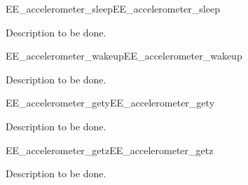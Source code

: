 \begin{function_nopb2}{EE\_accelerometer\_sleep}{EE_accelerometer_sleep}
  
  \begin{fundescription}
    Description to be done. 
  \end{fundescription}
  
  \begin{funreturn}
  \end{funreturn}
\end{function_nopb2}

\begin{function_nopb2}{EE\_accelerometer\_wakeup}{EE_accelerometer_wakeup}
  
  \begin{fundescription}
    Description to be done. 
  \end{fundescription}
  
  \begin{funreturn}
  \end{funreturn}
\end{function_nopb2}


\begin{function_nopb2}{EE\_accelerometer\_gety}{EE_accelerometer_gety}
  
  \begin{fundescription}
    Description to be done. 
  \end{fundescription}
  
  \begin{funreturn}
  \end{funreturn}
\end{function_nopb2}

\begin{function_nopb2}{EE\_accelerometer\_getz}{EE_accelerometer_getz}
  
  \begin{fundescription}
    Description to be done. 
  \end{fundescription}
  
  \begin{funreturn}
  \end{funreturn}
\end{function_nopb2}








